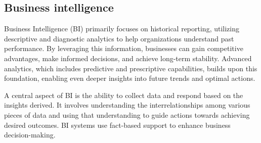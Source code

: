 \subsection{Business intelligence}
Business Intelligence (BI) primarily focuses on historical reporting, utilizing descriptive and diagnostic analytics to help organizations understand past performance. 
By leveraging this information, businesses can gain competitive advantages, make informed decisions, and achieve long-term stability. 
Advanced analytics, which includes predictive and prescriptive capabilities, builds upon this foundation, enabling even deeper insights into future trends and optimal actions.

A central aspect of BI is the ability to collect data and respond based on the insights derived. 
It involves understanding the interrelationships among various pieces of data and using that understanding to guide actions towards achieving desired outcomes. 
BI systems use fact-based support to enhance business decision-making.

